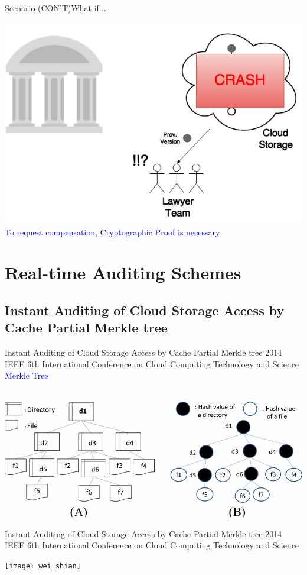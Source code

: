 \documentclass{beamer}
\begin{document}
\begin{CJK}{UTF8}{bkai}
\begin{frame}{Scenario (CON'T)}{What if...}
	\begin{center}
		\includegraphics[width=.7\textwidth]{Scenario3}\\
		\textcolor{blue}{To request compensation, \alert{Cryptographic Proof} is necessary}
	\end{center}
\end{frame}

\section{Real-time Auditing Schemes}
\subsection{\small{Instant Auditing of Cloud Storage Access by Cache Partial Merkle tree}}
\begin{frame}{\normalsize{Instant Auditing of Cloud Storage Access by Cache Partial Merkle tree}}
{\tiny{2014 IEEE 6th International Conference on Cloud Computing Technology and Science}}
	\textcolor{blue}{Merkle Tree}\\
	~\\
	\begin{center}
		\includegraphics[width=.85\textwidth]{merkle_tree}
	\end{center}
\end{frame}

\begin{frame}{\normalsize{Instant Auditing of Cloud Storage Access by Cache Partial Merkle tree}}
{\tiny{2014 IEEE 6th International Conference on Cloud Computing Technology and Science}}
	\begin{center}
		\texttt{[image: wei\_shian]}
	\end{center}
\end{frame}


\end{CJK}
\end{document}
